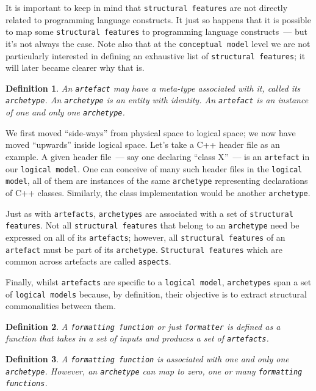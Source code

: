 \documentclass{book}
\newtheorem{concept}{Definition}
\begin{document}
It is important to keep in mind that \texttt{structural features} are
not directly related to programming language constructs. It just so
happens that it is possible to map some \texttt{structural features}
to programming language constructs~--- but it's not always the
case. Note also that at the \texttt{conceptual model} level we are not
particularly interested in defining an exhaustive list of
\texttt{structural features}; it will later became clearer why that
is.

\begin{concept}
An \texttt{artefact} may have a meta-type associated with it, called
its \texttt{archetype}. An \texttt{archetype} is an entity with
identity. An \texttt{artefact} is an instance of one and only one
\texttt{archetype}.
\end{concept}

We first moved ``side-ways'' from physical space to logical space; we
now have moved ``upwards'' inside logical space. Let's take a C++
header file as an example. A given header file~--- say one declaring
``class X''~--- is an \texttt{artefact} in our \texttt{logical
  model}. One can conceive of many such header files in the
\texttt{logical model}, all of them are instances of the same
\texttt{archetype} representing declarations of C++
classes. Similarly, the class implementation would be another
\texttt{archetype}.

Just as with \texttt{artefacts}, \texttt{archetypes} are associated
with a set of \texttt{structural features}. Not all \texttt{structural
  features} that belong to an \texttt{archetype} need be expressed on
all of its \texttt{artefacts}; however, all \texttt{structural
  features} of an \texttt{artefact} must be part of its
\texttt{archetype}. \texttt{Structural features} which are common
across artefacts are called \texttt{aspects}.

Finally, whilst \texttt{artefacts} are specific to a \texttt{logical
  model}, \texttt{archetypes} span a set of \texttt{logical models}
because, by definition, their objective is to extract structural
commonalities between them.

\begin{concept}
A \texttt{formatting function} or just \texttt{formatter} is defined
as a function that takes in a set of inputs and produces a set of
\texttt{artefacts}.
\end{concept}

\begin{concept}
A \texttt{formatting function} is associated with one and only one
\texttt{archetype}. However, an \texttt{archetype} can map to zero,
one or many \texttt{formatting functions}.
\end{concept}
\end{document}

